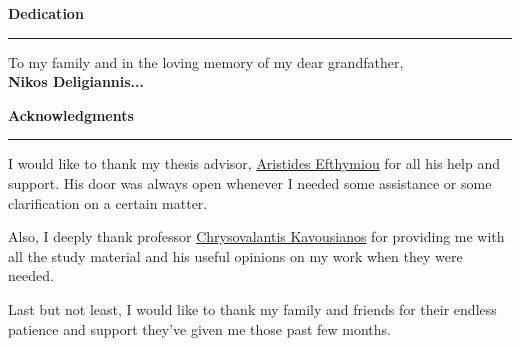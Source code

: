 
%

\label{Dedication}
\begin{flushleft}
\huge
\textbf{Dedication}\\
\noindent\rule{10cm}{0.4pt}
\end{flushleft}
To my family and in the loving memory of my dear grandfather, \\
\textbf{Nikos Deligiannis...}
\label{Acknowledgements}
\newpage
\begin{flushleft}
	\huge
	\textbf{Acknowledgments}\\
	\noindent\rule{10cm}{0.4pt}
\end{flushleft}
I would like to thank my thesis advisor, \underline{Aristides Efthymiou} for all his help and support. His door was always open whenever I needed some assistance or some clarification on a certain matter.\par
Also, I deeply thank professor \underline{Chrysovalantis Kavousianos} for providing me with all the study material and his useful opinions on my work when they were needed. \par
Last but not least, I would like to thank my family and friends for their endless patience and support they've given me those past few months.

%
